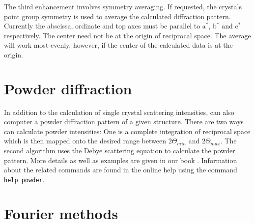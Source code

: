 The third enhancement involves symmetry averaging. If requested, the crystals 
point group symmetry is used to average the calculated diffraction pattern. 
Currently the abscissa, ordinate and top axes must be parallel to a$^{*}$, 
b$^{*}$ and c$^{*}$ respectively. The center need not be at the origin of 
reciprocal space.  The average will work most evenly, however, if the center of the
calculated data is at the origin.

\par

\section{Powder diffraction \label{four-powder}}

In addition to the calculation of single crystal scattering
intensities, {\Discus} can also computer a powder diffraction
pattern of a given structure. There are two ways {\Discus} can
calculate powder intensities: One is a complete integration of
reciprocal space which is then mapped onto the desired range between
$2\Theta_{min}$ and $2\Theta_{max}$. The second algorithm uses the
Debye scattering equation to calculate the powder pattern. More details as well
as examples are given in our book \citep{nedpro}. Information about
the related commands are found in the online help using the command
{\tt help powder}.
\par



\section{Fourier methods \label {four-methods}}


